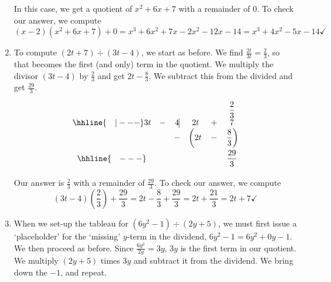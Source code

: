 \documentclass{ximera}
\begin{document}
\begin{exampleSol}
\begin{enumerate}
            In this case, we get a quotient of $x^2 + 6x + 7$ with a remainder of $0$.  To check our answer, we compute  \[(x-2)\left(x^2 + 6x + 7\right) + 0 = x^3 + 6x^2 + 7x - 2x^2 - 12x -14 =  x^3 + 4x^2 - 5x - 14  \checkmark \]
            
        \item To compute  $\left(2t +  7\right) \div \left(3t - 4\right)$, we start as before.  We find $\frac{2t}{3t} = \frac{2}{3}$, so that becomes the first (and only) term in the quotient.  We multiply the divisor $(3t-4)$ by $\frac{2}{3}$ and get $2t - \frac{8}{3}$.  We subtract this from the divided and get $\frac{29}{3}$.
            
            \setlength\arraycolsep{0.1pt}\setlength\extrarowheight{5pt}
            
            \[ 
            \begin{array}{cccccc}
                & & & & & \dfrac{2}{3} \\ \hhline{~~~|---}
                3t & - & 4  \vline& 2t & + & 7  \\
                &  &  -& \left(2t\vphantom{\dfrac{8}{3}} \right. & - & \left.  \dfrac{8}{3}\right)  \\ \hhline{~~~---}
                &  &  &   &  & \dfrac{29}{3} \vphantom{\sqrt{\dfrac{7}{7}}} \\ 
            \end{array}
            \]
            \setlength\arraycolsep{5pt}
            \setlength\extrarowheight{0pt}
            
            Our answer is $\frac{2}{3}$ with a remainder of $\frac{29}{3}$.  To check our answer, we compute 
            \[
                (3t-4) \left(\frac{2}{3}\right) + \frac{29}{3} = 2t - \frac{8}{3} + \frac{29}{3} = 2t + \frac{21}{3} = 2t + 7  \checkmark
            \]
        
        \item When we set-up the tableau for   $\left(6y^2 - 1 \right) \div \left(2y + 5\right)$, we must first issue a `placeholder' for the `missing' $y$-term in the dividend, $6y^2 -1 = 6y^2 + 0y - 1$.  We then proceed as before.  Since $\frac{6y^2}{2y} = 3y$, $3y$ is the first term in our quotient. We multiply $(2y+5)$ times $3y$ and subtract it from the dividend.  We bring down the $-1$, and repeat.  
        

\end{enumerate}
\end{exampleSol}
\end{document}
